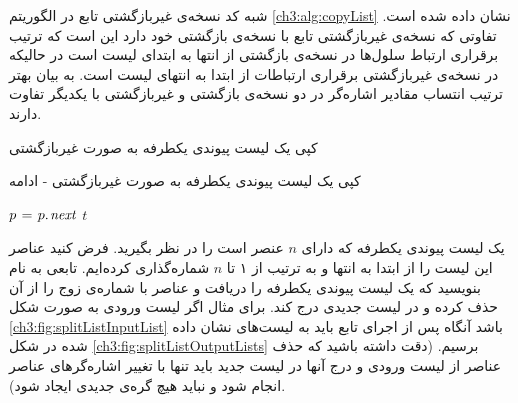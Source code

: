 
شبه کد نسخه‌ی غیربازگشتی تابع {} در الگوریتم {\eqref{ch3:alg:copyList}} نشان داده شده است. تفاوتی که نسخه‌ی غیربازگشتی تابع {} با نسخه‌ی بازگشتی خود دارد این است که ترتیب برقراری ارتباط سلول‌ها در نسخه‌ی بازگشتی از انتها به ابتدای لیست است در حالیکه در نسخه‌ی غیربازگشتی برقراری ارتباطات از ابتدا به انتهای لیست است. به بیان بهتر ترتیب انتساب مقادیر اشاره‌گر {} در دو نسخه‌ی بازگشتی و غیربازگشتی با یکدیگر تفاوت دارند.

\begin{algorithm}[H]
\caption{کپی یک لیست پیوندی یکطرفه به صورت غیربازگشتی}\label{ch3:alg:copyList}
\begin{latin}
\end{latin}
\end{algorithm}

\begin{algorithm}
\caption*{کپی یک لیست پیوندی یکطرفه به صورت غیربازگشتی - ادامه}
\begin{latin}
\begin{algorithmic}[1]
			\algrestore{copyListBrk}
				\EndIf
				\State	$p \gets {}$
		\EndWhile
		\State	\Return $t$
\EndFunction			
\end{algorithmic}
\end{latin}
\end{algorithm}

 یک لیست پیوندی یکطرفه‌ که دارای {$n$} عنصر است را در نظر بگیرید. فرض کنید عناصر این لیست را از ابتدا به انتها و به ترتیب از ۱ تا {$n$} شماره‌گذاری کرده‌ایم. تابعی به نام {} بنویسید که یک لیست پیوندی یکطرفه را دریافت و عناصر با شماره‌ی زوج را از آن حذف کرده و در لیست جدیدی درج کند. برای مثال اگر لیست ورودی به صورت شکل {\eqref{ch3:fig:splitListInputList}} باشد آنگاه پس از اجرای تابع باید به لیست‌های نشان داده شده در شکل {\eqref{ch3:fig:splitListOutputLists}} برسیم. (دقت داشته باشید که حذف عناصر از لیست ورودی و درج آنها در لیست جدید باید تنها با تغییر اشاره‌گرهای عناصر انجام شود و نباید هیچ گره‌‌ی جدیدی ایجاد شود).

